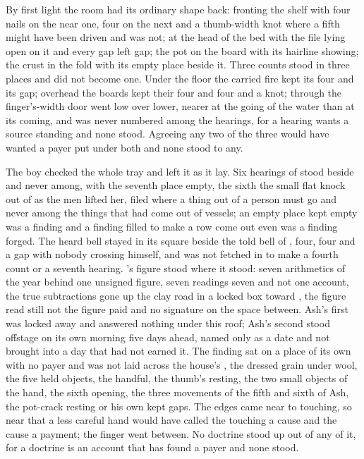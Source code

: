 By first light the room had its ordinary shape back:  fronting the shelf with four nails on the near one, four on the next and a thumb-width knot where a fifth might have been driven and was not;  at the head of the bed with the file lying open on it and every gap left gap; the pot on the board with its hairline showing; the crust in the fold with its empty place beside it. Three counts stood in three places and did not become one. Under the floor the carried fire kept its four and its gap; overhead the boards kept their four and four and a knot; through the finger's-width door  went low over lower, nearer at the going of the water than at its coming, and was never numbered among the hearings, for a hearing wants a source standing and none stood. Agreeing any two of the three would have wanted a payer put under both and none stood to any.

The boy checked the whole tray and left it as it lay. Six hearings of  stood beside and never among, with the seventh place empty, the sixth the small flat knock out of  as the men lifted her, filed where a thing out of a person must go and never among the things that had come out of vessels; an empty place kept empty was a finding and a finding filled to make a row come out even was a finding forged. The heard bell stayed in its square beside the told bell of , four, four and a gap with nobody crossing himself, and was not fetched in to make a fourth count or a seventh hearing. 's figure stood where it stood: seven arithmetics of the year behind one unsigned figure, seven readings seven and not one account, the true subtractions gone up the clay road in a locked box toward , the figure read still not the figure paid and no signature on the space between. Ash's first was locked away and answered nothing under this roof; Ash's second stood offstage on its own morning five days ahead, named only as a date and not brought into a day that had not earned it. The finding sat on a place of its own with no payer and was not laid across the house's , the dressed grain under wool, the five held objects, the handful, the thumb's resting, the two small objects of the hand, the sixth opening, the three movements of the fifth and sixth of Ash, the pot-crack resting or his own kept gaps. The edges came near to touching, so near that a less careful hand would have called the touching a cause and the cause a payment; the finger went between. No doctrine stood up out of any of it, for a doctrine is an account that has found a payer and none stood.

